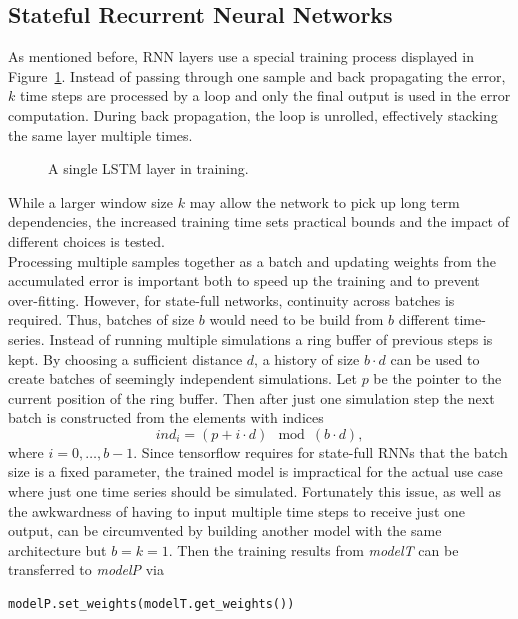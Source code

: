 \documentclass[sigconf]{acmart}
\begin{document}
\subsection{Stateful Recurrent Neural Networks}
As mentioned before, RNN layers use a special training process displayed in Figure~\ref{rnnTraining}. Instead of passing through one sample and back propagating the error, $k$ time steps are processed by a loop and only the final output is used in the error computation. During back propagation, the loop is unrolled, effectively stacking the same layer multiple times. 
\begin{figure}
	\caption{A single LSTM layer in training.}
	\label{rnnTraining}
\end{figure}
While a larger window size $k$ may allow the network to pick up long term dependencies, the increased training time sets practical bounds and the impact of different choices is tested.\\
Processing multiple samples together as a batch and updating weights from the accumulated error is important both to speed up the training and to prevent over-fitting. However, for state-full networks, continuity across batches is required. Thus, batches of size $b$ would need to be build from $b$ different time-series. Instead of running multiple simulations a ring buffer of previous steps is kept. By choosing a sufficient distance $d$, a history of size $b \cdot d$ can be used to create batches of seemingly independent simulations. Let $p$ be the pointer to the current position of the ring buffer. Then after just one simulation step the next batch is constructed from the elements with indices
\[
ind_i = (p + i \cdot d) \mod (b \cdot d),
\]
where $i=0,\dots,b-1$.
Since tensorflow requires for state-full RNNs that the batch size is a fixed parameter, the trained model is impractical for the actual use case where just one time series should be simulated. Fortunately this issue, as well as the awkwardness of having to input multiple time steps to receive just one output, can be circumvented by building another model with the same architecture but $b=k=1$. Then the training results from \textit{modelT} can be transferred to \textit{modelP} via 
\begin{verbatim}
modelP.set_weights(modelT.get_weights())
\end{verbatim}
\end{document}
